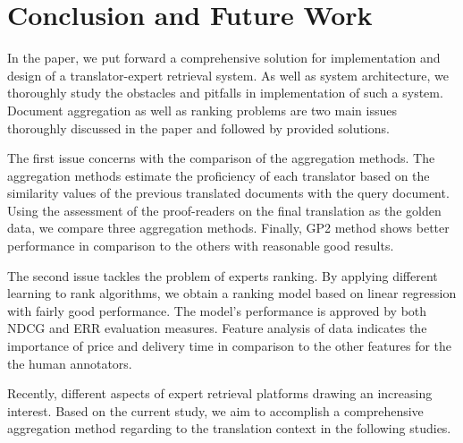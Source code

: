 \section{Conclusion and Future Work}
\label{sec:conclusion}
In the paper, we put forward a comprehensive solution for implementation and design of a translator-expert retrieval system. As well as system architecture, we thoroughly study the obstacles and pitfalls in implementation of such a system. Document aggregation as well as ranking problems are two main issues thoroughly discussed in the paper and followed by provided solutions.

The first issue concerns with the comparison of the aggregation methods. The aggregation methods estimate the proficiency of each translator based on the similarity values of the previous translated documents with the query document. Using the assessment of the proof-readers on the final translation as the golden data, we compare three aggregation methods. Finally, GP2 method shows better performance in comparison to the others with reasonable good results.

The second issue tackles the problem of experts ranking. By applying different learning to rank algorithms, we obtain a ranking model based on linear regression with fairly good performance. The model's performance is approved by both NDCG and ERR evaluation measures. Feature analysis of data indicates the importance of price and delivery time in comparison to the other features for the the human annotators.

Recently, different aspects of expert retrieval platforms drawing an increasing interest. Based on the current study, we aim to accomplish a comprehensive aggregation method regarding to the translation context in the following studies.